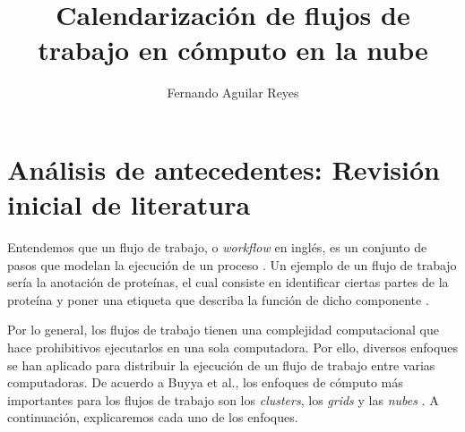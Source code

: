 \documentclass{article}
\title{Calendarización de flujos de trabajo en cómputo en la nube}
\author{Fernando Aguilar Reyes}
\begin{document}
\maketitle

\section{Análisis de antecedentes: Revisión inicial de literatura}

Entendemos que un flujo de trabajo, o \emph{workflow} en inglés, es un conjunto de pasos que modelan la ejecución de un proceso \cite{gutierrez2012agent}. Un ejemplo de un flujo de trabajo sería la anotación de proteínas, el cual consiste en identificar ciertas partes de la proteína y poner una etiqueta que describa la función de dicho componente \cite{o2004mapping}. 

Por lo general, los flujos de trabajo tienen una complejidad computacional que hace prohibitivos ejecutarlos en una sola computadora. Por ello, diversos enfoques se han aplicado para distribuir la ejecución de un flujo de trabajo entre varias computadoras.  De acuerdo a Buyya et al., los enfoques de cómputo más importantes para los flujos de trabajo son los \emph{clusters}, los \emph{grids} y las \emph{nubes} \cite{buyya2009cloud}. A continuación, explicaremos cada uno de los enfoques.
\end{document}

